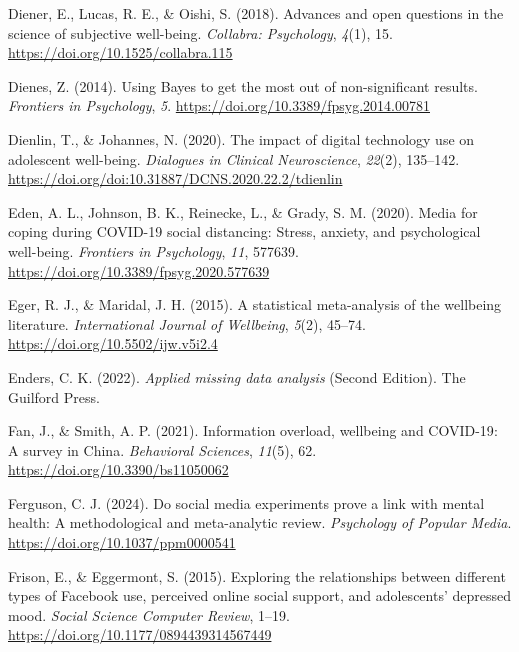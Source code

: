 \documentclass[
  man,mask,floatsintext]{apa7}
\newlength{\cslhangindent}
\newenvironment{CSLReferences}[2] %
 {\begin{list}{}{%
  \setlength{\itemindent}{0pt}
  \setlength{\leftmargin}{0pt}
  \setlength{\parsep}{0pt}
  \ifodd #1
   \setlength{\leftmargin}{\cslhangindent}
   \setlength{\itemindent}{-1\cslhangindent}
  \fi
  \setlength{\itemsep}{#2\baselineskip}}}
 {\end{list}}
\begin{document}
\begin{CSLReferences}{1}{0}
Diener, E., Lucas, R. E., \& Oishi, S. (2018). Advances and open questions in the science of subjective well-being. \emph{Collabra: Psychology}, \emph{4}(1), 15. \url{https://doi.org/10.1525/collabra.115}

Dienes, Z. (2014). Using {Bayes} to get the most out of non-significant results. \emph{Frontiers in Psychology}, \emph{5}. \url{https://doi.org/10.3389/fpsyg.2014.00781}

Dienlin, T., \& Johannes, N. (2020). The impact of digital technology use on adolescent well-being. \emph{Dialogues in Clinical Neuroscience}, \emph{22}(2), 135--142. \url{https://doi.org/doi:10.31887/DCNS.2020.22.2/tdienlin}

Eden, A. L., Johnson, B. K., Reinecke, L., \& Grady, S. M. (2020). Media for coping during {COVID-19} social distancing: {Stress}, anxiety, and psychological well-being. \emph{Frontiers in Psychology}, \emph{11}, 577639. \url{https://doi.org/10.3389/fpsyg.2020.577639}

Eger, R. J., \& Maridal, J. H. (2015). A statistical meta-analysis of the wellbeing literature. \emph{International Journal of Wellbeing}, \emph{5}(2), 45--74. \url{https://doi.org/10.5502/ijw.v5i2.4}

Enders, C. K. (2022). \emph{Applied missing data analysis} (Second Edition). The Guilford Press.

Fan, J., \& Smith, A. P. (2021). Information overload, wellbeing and {COVID-19}: {A} survey in {China}. \emph{Behavioral Sciences}, \emph{11}(5), 62. \url{https://doi.org/10.3390/bs11050062}

Ferguson, C. J. (2024). Do social media experiments prove a link with mental health: {A} methodological and meta-analytic review. \emph{Psychology of Popular Media}. \url{https://doi.org/10.1037/ppm0000541}

Frison, E., \& Eggermont, S. (2015). Exploring the relationships between different types of {Facebook} use, perceived online social support, and adolescents' depressed mood. \emph{Social Science Computer Review}, 1--19. \url{https://doi.org/10.1177/0894439314567449}


\end{CSLReferences}
\end{document}
